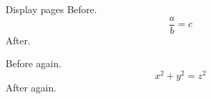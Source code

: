 \documentclass{beamer}
\begin{document}
\begin{frame}[allowframebreaks]{Display pages}
Before.
\[\frac{a}{b}=c\]
After.\par\framebreak
Before again.
\[x^2+y^2=z^2\]
After again.
\end{frame}
\end{document}
